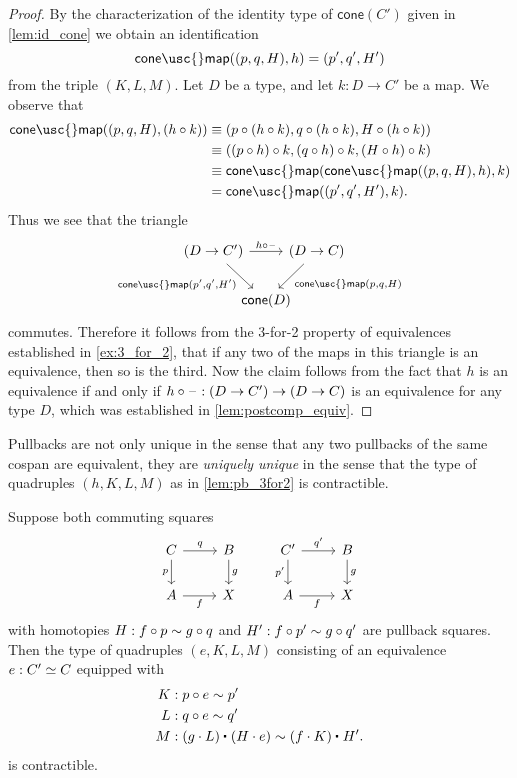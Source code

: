 \begin{proof}
By the characterization of the identity type of $\mathsf{cone}(C')$ given in \cref{lem:id_cone} we obtain an identification
\begin{equation*}
\mathsf{cone\usc{}map}((p,q,H),h)=(p',q',H')
\end{equation*}
from the triple $(K,L,M)$. 
Let $D$ be a type, and let $k:D\to C'$ be a map. We observe that
\begin{align*}
\mathsf{cone\usc{}map}((p,q,H),(h\circ k)) & \jdeq (p\circ (h\circ k),q\circ (h\circ k),H\circ (h\circ k)) \\
& \jdeq ((p\circ h)\circ k,(q\circ h)\circ k, (H\circ h)\circ k) \\
& \jdeq \mathsf{cone\usc{}map}(\mathsf{cone\usc{}map}((p,q,H),h),k) \\
& = \mathsf{cone\usc{}map}((p',q',H'),k).
\end{align*}
Thus we see that the triangle 
\begin{equation*}
\begin{tikzcd}[column sep=-1em]
(D\to C') \arrow[rr,"{h\circ \blank}"] \arrow[dr,swap,"{\mathsf{cone\usc{}map}(p',q',H')}"] & & (D\to C) \arrow[dl,"{\mathsf{cone\usc{}map}(p,q,H)}"] \\
& \mathsf{cone}(D)
\end{tikzcd}
\end{equation*}
commutes. Therefore it follows from the 3-for-2 property of equivalences established in \cref{ex:3_for_2}, that if any two of the maps in this triangle is an equivalence, then so is the third. Now the claim follows from the fact that $h$ is an equivalence if and only if $h\circ\mathord{\hspace{1pt}\text{--}\hspace{1pt}} : (D\to C')\to (D\to C)$ is an equivalence for any type $D$, which was established in \cref{lem:postcomp_equiv}.
\end{proof}

Pullbacks are not only unique in the sense that any two pullbacks of the same cospan are equivalent, they are \emph{uniquely unique} in the sense that the type of quadruples $(h,K,L,M)$ as in \cref{lem:pb_3for2} is contractible.

\begin{cor}
Suppose both commuting squares
\begin{equation*}
\begin{tikzcd}
C \arrow[r,"q"] \arrow[d,swap,"p"] & B \arrow[d,"g"] & {C'} \arrow[r,"{q'}"] \arrow[d,swap,"{p'}"] & B \arrow[d,"g"] \\
A \arrow[r,swap,"f"] & X & A \arrow[r,swap,"f"] & X
\end{tikzcd}
\end{equation*}
with homotopies $H:f\circ p \sim g\circ q$ and $H':f\circ p'\sim g\circ q'$ are pullback squares.
Then the type of quadruples $(e,K,L,M)$ consisting of an equivalence $e:\eqv{C'}{C}$ equipped with
\begin{align*}
K & : p\circ e \htpy p' \\
L & : q\circ e \htpy q' \\
M & : \ct{(g\cdot L)}{(H\cdot e)} \htpy \ct{(f\cdot K)}{H'}.
\end{align*}
is contractible.
\end{cor}

